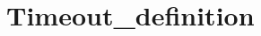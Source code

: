 \hypertarget{group___timeout__definition}{\section{Timeout\-\_\-definition}
\label{group___timeout__definition}
}
